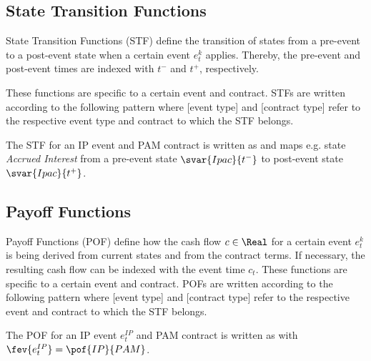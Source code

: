 
\subsection{State Transition Functions}\label{sec:stf}

State Transition Functions (STF) define the transition of states from a pre-event to a post-event state when a certain event $e_t^{k}$ applies. Thereby, the pre-event and post-event times are indexed with $t^-$ and $t^+$, respectively. 

These functions are specific to a certain event and contract. STFs are written according to the following pattern  where [event type] and [contract type] refer to the respective event type and contract to which the STF belongs.

\begin{example}
The STF for an IP event and PAM contract is written as  and maps e.g. state \textit{Accrued Interest} from a pre-event state $\svar{Ipac}{t^-}$ to post-event state $\svar{Ipac}{t^+}$.
\end{example}


\subsection{Payoff Functions}\label{sec:pof}

Payoff Functions (POF) define how the cash flow $c\in\Real$ for a certain event $e_t^k$ is being derived from current states and from the contract terms. If necessary, the resulting cash flow can be indexed with the event time $c_t$. These functions are specific to a certain event and contract. POFs are written according to the following pattern  where [event type] and [contract type] refer to the respective event and contract to which the STF belongs.

\begin{example}
The POF for an IP event $e_t^{IP}$ and PAM contract is written as  with $\fev{e_t^{IP}}=\pof{IP}{PAM}$.
\end{example}

